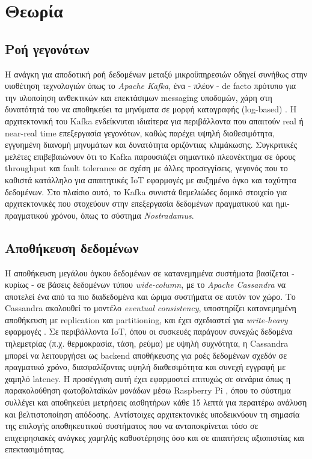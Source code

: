 \chapter{Θεωρία}

\section{Ροή γεγονότων}

Η ανάγκη για αποδοτική ροή δεδομένων μεταξύ μικροϋπηρεσιών οδηγεί συνήθως στην υιοθέτηση τεχνολογιών όπως το \textit{Apache Kafka}, ένα - πλέον - de facto πρότυπο για την υλοποίηση ανθεκτικών και επεκτάσιμων messaging υποδομών, χάρη στη δυνατότητά του να αποθηκεύει τα μηνύματα σε μορφή καταγραφής (log-based) \cite{kafkabdd}. Η αρχιτεκτονική του Kafka ενδείκνυται ιδιαίτερα για περιβάλλοντα που απαιτούν real ή near-real time επεξεργασία γεγονότων, καθώς παρέχει υψηλή διαθεσιμότητα, εγγυημένη διανομή μηνυμάτων και δυνατότητα οριζόντιας κλιμάκωσης. Συγκριτικές μελέτες \cite{rtkafka} επιβεβαιώνουν ότι το Kafka παρουσιάζει σημαντικό πλεονέκτημα σε όρους throughput και fault tolerance σε σχέση με άλλες προσεγγίσεις, γεγονός που το καθιστά κατάλληλο για απαιτητικές IoT εφαρμογές με αυξημένο όγκο και ταχύτητα δεδομένων. Στο πλαίσιο αυτό, το Kafka συνιστά θεμελιώδες δομικό στοιχείο για αρχιτεκτονικές που στοχεύουν στην επεξεργασία δεδομένων πραγματικού και ημι-πραγματικού χρόνου, όπως το σύστημα \textit{Nostradamus}.

\section{Αποθήκευση δεδομένων}

Η αποθήκευση μεγάλου όγκου δεδομένων σε κατανεμημένα συστήματα βασίζεται - κυρίως - σε βάσεις δεδομένων τύπου \textit{wide-column}, με το \textit{Apache Cassandra} να αποτελεί ένα από τα πιο διαδεδομένα και ώριμα συστήματα σε αυτόν τον χώρο. Το Cassandra ακολουθεί το μοντέλο \textit{eventual consistency}, υποστηρίζει κατανεμημένη αποθήκευση με replication και partitioning, και έχει σχεδιαστεί για \textit{write-heavy} εφαρμογές \cite{cassandrawp}. Σε περιβάλλοντα IoT, όπου οι συσκευές παράγουν συνεχώς δεδομένα τηλεμετρίας (π.χ. θερμοκρασία, τάση, ρεύμα) με υψηλή συχνότητα, η Cassandra μπορεί να λειτουργήσει ως backend αποθήκευσης για ροές δεδομένων σχεδόν σε πραγματικό χρόνο, διασφαλίζοντας υψηλή διαθεσιμότητα και συνεχή εγγραφή με χαμηλό latency. Η προσέγγιση αυτή έχει εφαρμοστεί επιτυχώς σε σενάρια όπως η παρακολούθηση φωτοβολταϊκών μονάδων μέσω Raspberry Pi \cite{iotcassandra}, όπου το σύστημα συλλέγει και αποθηκεύει μετρήσεις αισθητήρων κάθε 15 λεπτά για περαιτέρω ανάλυση και βελτιστοποίηση απόδοσης. Αντίστοιχες αρχιτεκτονικές υποδεικνύουν τη σημασία της επιλογής αποθηκευτικού συστήματος που να ανταποκρίνεται τόσο σε επιχειρησιακές ανάγκες χαμηλής καθυστέρησης όσο και σε απαιτήσεις αξιοπιστίας και επεκτασιμότητας.

